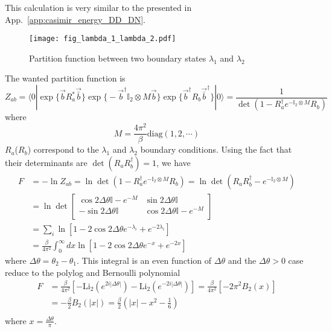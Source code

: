 
This calculation is very similar to the presented in App.~\ref{app:casimir_energy_DD_DN}. 

\begin{figure}[h]
\centering
\texttt{[image: fig\_lambda\_1\_lambda\_2.pdf]}
\caption{Partition function between two boundary states $\lambda_1$ and $\lambda_2$}
\end{figure}

The wanted partition function is
\begin{equation}
Z_{ab} = \langle 0 | \exp\Big\{ \vec{b} R_a^* \vec{\bar{b}}\Big\} \exp\Big\{ - \vec{b}^{\dagger} \mathbb{I}_2 \otimes M  \vec{b} \Big\}   \exp\Big\{  \vec{b}^{\dagger} R_b  \vec{\bar{b}}^{\dagger}\Big\}  |0  \rangle  = \frac{1}{\det ( 1 - R^{\dagger} _a  e^{- \mathbb{I}_2 \otimes M} R_b) }
\end{equation}
where
\begin{equation}
M =  \frac{4\pi^2}{\beta} \text{diag}( 1, 2, \cdots )
\end{equation}
$R_a$($R_b$) correspond to the $\lambda_1$ and $\lambda_2$ boundary conditions. Using the fact that their determinants are $\det( R_a R_b^{\dagger})  = 1$, we have
\begin{equation}
\begin{aligned}
F &= - \ln Z_{ab} = \ln \det( 1 - R^{\dagger} _a  e^{- \mathbb{I}_2 \otimes M} R_b ) = \ln \det ( R_a R_b^{\dagger} - e^{- \mathbb{I}_2 \otimes M} )\\
& = \ln \det 
\begin{bmatrix}
\cos 2 \Delta \theta \mathbb{I} - e^{-M}   & \sin 2 \Delta \theta \mathbb{I}\\
- \sin 2\Delta \theta \mathbb{I}  &   \cos 2 \Delta \theta \mathbb{I} - e^{-M} \\ 
\end{bmatrix} \\
& = \sum_i \ln [ 1 - 2 \cos 2 \Delta \theta e^{- \lambda_i } + e^{- 2 \lambda_i }  ] \\
& = \frac{\beta}{4\pi^2} \int_0^{\infty} dx \ln [ 1 - 2 \cos 2 \Delta \theta e^{-x} + e^{-2x} ] 
\end{aligned}
\end{equation}
where $\Delta \theta = \theta_2 - \theta_1$. This integral is an even function of $\Delta \theta$ and the $\Delta \theta > 0$ case reduce to the polylog and Bernoulli polynomial
\begin{equation}
\begin{aligned}
  F &= \frac{\beta}{4\pi^2} \left[ - \text{Li}_2 ( e^{2i |\Delta \theta|} ) - \text{Li}_2 ( e^{- 2i |\Delta \theta|} ) \right]  = \frac{\beta}{4\pi^2}  \left[ - 2\pi^2 B_2 (x) \right] \\
  &= - \frac{\beta}{2} B_2( |x| ) = \frac{\beta}{2} (|x| - x^2 - \frac{1}{6}) \\
\end{aligned}
\end{equation}
where $x = \frac{\Delta \theta}{ \pi}$. 

